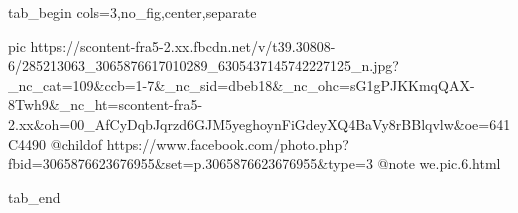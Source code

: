  
 
 
 
 


\ifcmt
  tab_begin cols=3,no_fig,center,separate

     pic https://scontent-fra5-2.xx.fbcdn.net/v/t39.30808-6/285213063_3065876617010289_6305437145742227125_n.jpg?_nc_cat=109&ccb=1-7&_nc_sid=dbeb18&_nc_ohc=sG1gPJKKmqQAX-8Twh9&_nc_ht=scontent-fra5-2.xx&oh=00_AfCyDqbJqrzd6GJM5yeghoynFiGdeyXQ4BaVy8rBBlqvlw&oe=641C4490
		 @childof https://www.facebook.com/photo.php?fbid=3065876623676955&set=p.3065876623676955&type=3
		 @note we.pic.6.html

  tab_end
\fi
